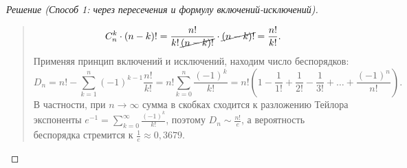 \begin{proof}[Решение (Способ 1: через пересечения и формулу включений-исключений)]
\begin{quote}
\[            C_n^k \cdot (n - k)! = \frac{n!}{k! \, \cancel{(n - k)!}} \cdot 
            \cancel{(n - k)!} = \frac{n!}{k!}.
        \]
        Применяя принцип включений и исключений, находим число 
        беспорядков:
        \begin{equation} \label{eq:derange_pie}
            D_n = n! - \sum_{k=1}^{n} (-1)^{k-1} \frac{n!}{k!} = 
            n! \sum_{k=0}^{n} \frac{(-1)^k}{k!} = 
            n!\left(1 - \frac{1}{1!} + \frac{1}{2!} - \frac{1}{3!} + \dots + 
            \frac{(-1)^n}{n!}\right). \tag{11}
        \end{equation}
        В частности, при $n \to \infty$ сумма в скобках сходится к 
        разложению Тейлора экспоненты $e^{-1} = \sum_{k=0}^\infty \frac{(-1)^k}{k!}$, 
        поэтому $D_n \sim \frac{n!}{e}$, а вероятность беспорядка 
        стремится к $\frac{1}{e} \approx 0,3679$.
    \end{quote}
\end{proof}

